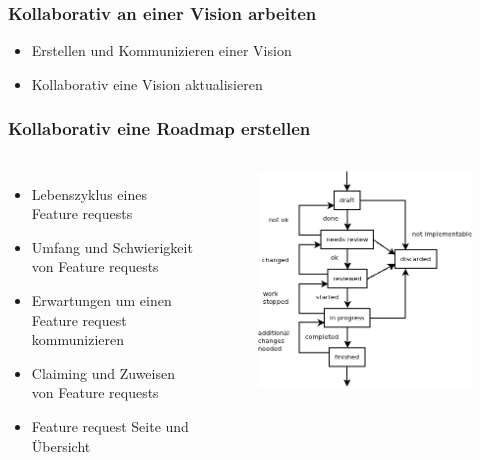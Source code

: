 \documentclass{beamer}
\begin{document}
\begin{frame}
\frametitle{Kollaborativ an einer Vision arbeiten}
\begin{itemize}
 \item Erstellen und Kommunizieren einer Vision
 \item Kollaborativ eine Vision aktualisieren
\end{itemize}
\end{frame}

\begin{frame}
\frametitle{Kollaborativ eine Roadmap erstellen}
\begin{columns}
  \begin{itemize}
   \item Lebenszyklus eines Feature requests
   \item Umfang und Schwierigkeit von Feature requests
   \item Erwartungen um einen Feature request kommunizieren
   \item Claiming und Zuweisen von Feature requests
   \item Feature request Seite und \"Ubersicht
  \end{itemize}
  \begin{figure}[h!]
   \centering
   \includegraphics[scale=0.4,keepaspectratio=true]{./featurerequeststates.png}
  \end{figure}
\end{columns}
\end{frame}
\end{document}

